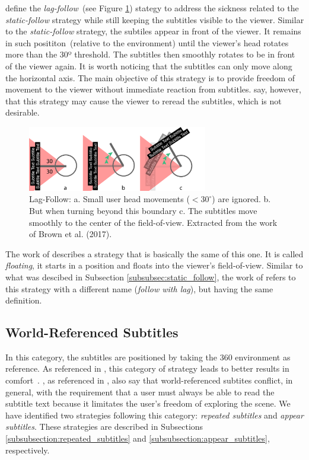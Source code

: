  define the \emph{lag-follow}~(see Figure \ref{fig:lag_follow}) stategy to address the sickness related to the \emph{static-follow} strategy while still keeping the subtitles visible to the viewer. Similar to the \emph{static-follow} strategy, the subtiles appear in front of the viewer. It remains in such posititon~(relative to the environment) until the viewer's head rotates more than the 30º threshold. The subtitles then smoothly rotates to be in front of the viewer again. It is worth noticing that the subtitles can only move along the horizontal axis. The main objective of this strategy is to provide freedom of movement to the viewer without immediate reaction from subtitles.  say, however, that this strategy may cause the viewer to reread the subtitles, which is not desirable.


\begin{figure}[!ht]
    \centering
    \includegraphics[width=0.7\textwidth]{img/lag-follow.png}
    \caption{Lag-Follow: a. Small user head movements ($<30^{\circ}$) are ignored. b. But when turning beyond this boundary c. The subtitles move smoothly to the center of the field-of-view. Extracted from the work of Brown et al. (2017).}
    \label{fig:lag_follow}
\end{figure}

The work of  describes a strategy that is basically the same of this one. It is called \emph{floating}, it starts in a position and floats into the viewer's field-of-view. Similar to what was descibed in Subsection \ref{subsubsec:static_follow}, the work of  refers to this strategy with a different name (\emph{follow with lag}), but having the same definition.

\subsection{World-Referenced Subtitles}
\label{subsec:world_referenced}
In this category, the subtitles are positioned by taking the 360 environment as reference. 
As referenced in \cite{hughes_disruptive_2019}, this category of strategy leads to better results in comfort~\cite{rothe2018positioning}. , as referenced in , also say that world-referenced subtites conflict, in general, with the requirement that a user must always be able to read the subtitle text because it limitates the user's freedom of exploring the scene.
We have identified two strategies following this category: \emph{repeated subtitles} and \emph{appear subtitles}. These strategies are described in Subsections \ref{subsubsection:repeated_subtitles} and \ref{subsubsection:appear_subtitles}, respectively. 

